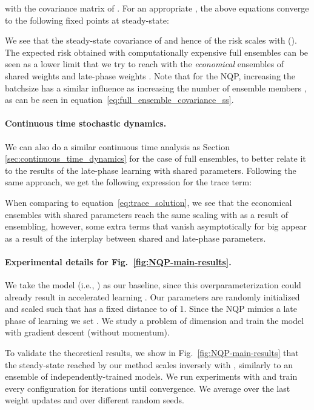 \documentclass{article} \usepackage{iclr2021_conference,times}
\def\eqref#1{equation~\ref{#1}}
\begin{document}
with  the covariance matrix of . For an appropriate , the above equations converge to the following fixed points at steady-state: 

We see that the steady-state covariance of  and hence of the risk  scales with  (). The expected risk  obtained with computationally expensive full ensembles can be seen as a lower limit that we try to reach with the \textit{economical} ensembles of shared weights  and late-phase weights . Note that for the NQP, increasing the batchsize  has a similar influence as increasing the number of ensemble members , as can be seen in \eqref{eq:full_ensemble_covariance_ss}. 

\paragraph{Continuous time stochastic dynamics.} We can also do a similar continuous time analysis as Section \ref{sec:continuous_time_dynamics} for the case of full ensembles, to better relate it to the results of the late-phase learning with shared parameters. Following the same approach, we get the following expression for the trace term: 

When comparing to \eqref{eq:trace_solution}, we see that the economical ensembles with shared parameters reach the same scaling with  as a result of ensembling, however, some extra terms that vanish asymptotically for big  appear as a result of the interplay between shared and late-phase parameters. 

\paragraph{Experimental details for Fig.~\ref{fig:NQP-main-results}.} We take the model  (i.e., ) as our baseline, since this overparameterization could already result in accelerated learning \citep{arora_optimization_2018}. Our parameters are randomly initialized and scaled such that  has a fixed distance to  of 1. Since the NQP mimics a late phase of learning we set . We study a problem of dimension  and train the model with gradient descent (without momentum).

To validate the theoretical results, we show in Fig.~\ref{fig:NQP-main-results} that
the steady-state reached by our method scales inversely with , similarly to an ensemble of independently-trained models. We run experiments with  and train every configuration for  iterations until convergence. We average over the last  weight updates and over  different random seeds.
\end{document}
